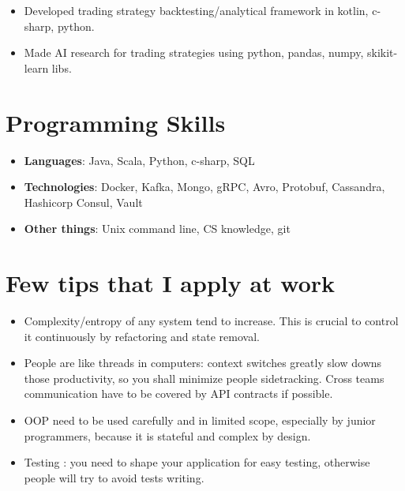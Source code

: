 \documentclass[letterpaper,11pt]{article}
\begin{document}
\begin{itemize}
 \item Developed trading strategy backtesting/analytical framework in kotlin, c-sharp, python.
 \item Made AI research for trading strategies using python, pandas, numpy, skikit-learn libs.
\end{itemize}

%
\section{Programming Skills}
      \begin{itemize}  
	\item \textbf{Languages}{: Java, Scala, Python, c-sharp, SQL}
	\item \textbf{Technologies}{: Docker, Kafka, Mongo, gRPC, Avro, Protobuf, Cassandra, Hashicorp Consul, Vault}
	\item \textbf{Other things}{: Unix command line, CS knowledge, git}
      \end{itemize} 
      
\section{Few tips that I apply at work}  


\begin{itemize}
 \item Complexity/entropy of any system tend to increase. This is crucial to control it continuously by refactoring and state removal.
 \item People are like threads in computers: context switches greatly slow downs those productivity, so you shall minimize people sidetracking. Cross teams communication have to be covered by API contracts if possible. 
 \item OOP need to be used carefully and in limited scope, especially by junior programmers, because it is stateful and complex by design. 
 \item Testing : you need to shape your application for easy testing, otherwise people will try to avoid tests writing.

\end{itemize}
      
\end{document}

